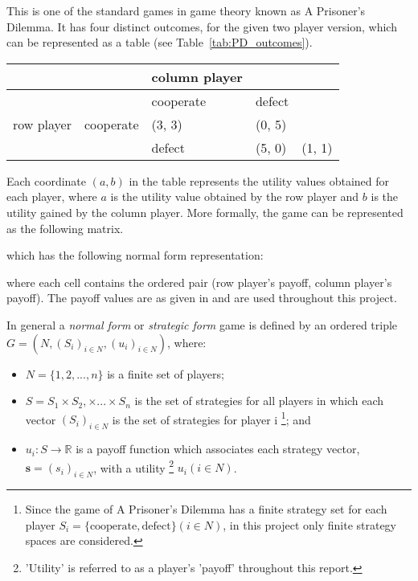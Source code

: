 This is one of the standard games in game theory known as A Prisoner's Dilemma.
It has four distinct outcomes, for the given two player version, which can be represented as a table (see
Table~\ref{tab:PD_outcomes}).
\begin{tabular}{|c|}\label{tab:PD_outcomes}
    \hline
      &  & column player & \\
    \hline 
      &  & cooperate & defect\\
    \hline
    row player & cooperate & (3, 3) & (0, 5)\\
    \hline 
      &  & defect & (5, 0) & (1, 1)\\
    \hline
\end{tabular}
Each coordinate \((a, b)\) in the table represents the utility values obtained
for each player, where  \(a\) is the utility value obtained by the row player
and \(b\) is the utility gained by the column player. More formally, the game
can be represented as the following matrix.




which has the following normal form representation:

\label{PDMatrix}

where each cell contains the ordered pair (row player's payoff, column player's
payoff). The payoff values are as given in \cite{axelrod1980effective} and are
used throughout this project.

In general a \textit{normal form} or \textit{strategic form} game is defined by
an ordered triple $G = (N, (S_i)_{i \in N}, (u_i)_{i \in N})$, where:
\begin{itemize}
    \item $N = \{1, 2,..., n\}$ is a finite set of players;
    \item $S = S_1 \times S_2, \times ... \times S_n$ is the set of strategies
    for all players in which each vector $(S_i)_{i \in N}$ is the set of
    strategies for player i \footnote{Since the game of A Prisoner's Dilemma has
    a finite strategy set for each player $S_i = \{ \text{cooperate},
    \text{defect}\} (i \in N)$, in this project only finite strategy spaces are
    considered.}; and
    \item $u_i : S \to \mathbb{R}$ is a payoff function which associates each
    strategy vector, $\textbf{s} = (s_i)_{i \in N}$, with a utility
    \footnote{'Utility' is referred to as a player's 'payoff' throughout this
    report.} $u_i(i \in N)$.
\end{itemize}
\cite{maschler_solan_zamir_2013}


